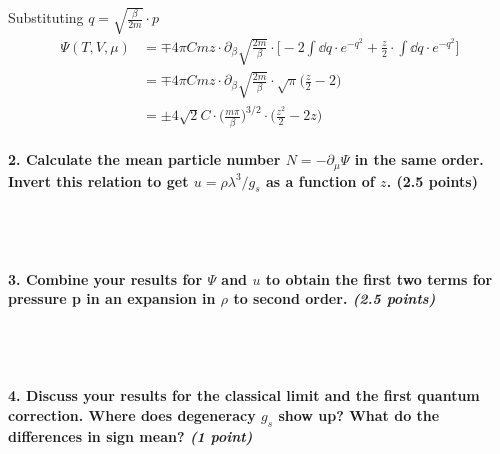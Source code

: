     Substituting $q=\sqrt{\frac{\beta}{2m}}\cdot p$
    \begin{align}
        \Psi(T,V,\mu)
        &=\mp 4\pi Cmz\cdot\partial_\beta
            \sqrt{\frac{2m}{\beta}}\cdot\bigg[
            -2\int \dd q\cdot
                e^{-q^2}
            +\frac{z}{2}\cdot\int \dd q\cdot
                e^{-q^2}
        \bigg] \\
        &=\mp 4\pi Cmz\cdot\partial_\beta
        \sqrt{\frac{2m}{\beta}}\cdot\sqrt{\pi}\bigg(
            \frac{z}{2}-2
        \bigg) \\
        &=\pm 4\sqrt{2}C\cdot
        \bigg(
            \frac{m\pi}{\beta}
            \bigg)^{3/2}\cdot\bigg(
            \frac{z^2}{2}-2z
        \bigg)
    \end{align}

\paragraph{2. Calculate the mean particle number 
    $N =-\partial_\mu\Psi$ in the same order. Invert this 
    relation to get $u=\rho\lambda^3/g_s$ as a function of $z$. 
    (2.5 points)
} \ \\
    \\

\paragraph{3. Combine your results for $\Psi$ and $u$ to obtain 
    the first two terms for pressure p in an expansion in 
    $\rho$ to second order. \textit{(2.5 points)}
} \ \\
    \\

\paragraph{4. Discuss your results for the classical limit and 
    the first quantum correction. Where does degeneracy $g_s$
    show up? What do the differences in sign mean?
    \textit{(1 point)}
} \ \\
    \\
